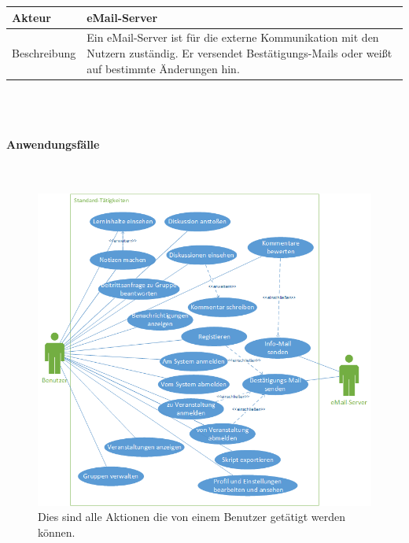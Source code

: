 \documentclass[12pt,a4paper]{article}
\begin{document}
\begin{tabular}{l p{12cm}}
Akteur & \textbf{eMail-Server} \\ 
\hline Beschreibung & Ein eMail-Server ist für die externe Kommunikation mit den Nutzern zuständig. Er versendet Bestätigungs-Mails oder weißt auf bestimmte Änderungen hin. \\ 
\end{tabular}\\\\

\newpage

\paragraph{Anwendungsfälle}\mbox{}\\

\begin{figure}[H]
	\centering
	\includegraphics[width=\textwidth]{Bilder/Anwendungsfalldiagramme/Benutzer.png}
	\caption{Dies sind alle Aktionen die von einem Benutzer getätigt werden können.}
	\label{AwfBenutzer}
\end{figure}
\end{document}
